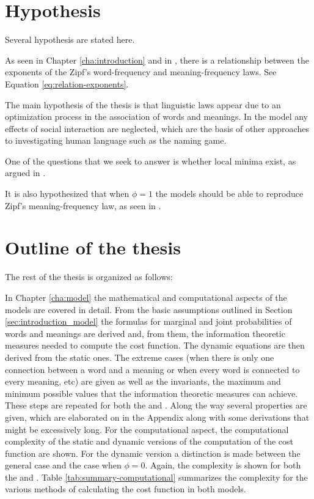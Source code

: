 \section{Hypothesis}
\label{sec:introduction_hypothesis}

Several hypothesis are stated here.

As seen in Chapter \ref{cha:introduction} and in \cite{Ferrer2018a}, there is a relationship between the exponents of the Zipf's word-frequency and meaning-frequency laws.
See Equation \eqref{eq:relation-exponents}.

The main hypothesis of the thesis is that linguistic laws appear due to an optimization process in the association of words and meanings.
In the model any effects of social interaction are neglected, which are the basis of other approaches to investigating human language such as the naming game. \cite{Baronchelli2006}

One of the questions that we seek to answer is whether local minima exist, as argued in \cite{Ferrer2017a}.

It is also hypothesized that when $\phi=1$ the models should be able to reproduce Zipf's meaning-frequency law, as seen in \cite{Ferrer2018a}.

\section{Outline of the thesis}
\label{sec:introduction_outline}

The rest of the thesis is organized as follows:

In Chapter \ref{cha:model} the mathematical and computational aspects of the models are covered in detail.
From the basic assumptions outlined in Section \ref{sec:introduction_model} the formulas for marginal and joint probabilities of words and meanings are derived and, from them, the information theoretic measures needed to compute the cost function.
The dynamic equations are then derived from the static ones. The extreme cases (when there is only one connection between a word and a meaning or when every word is connected to every meaning, etc) are given as well as the invariants, the maximum and minimum possible values that the information theoretic measures can achieve.
These steps are repeated for both the \firstm{} and \secondmodel{}.
Along the way several properties are given, which are elaborated on in the Appendix along with some derivations that might be excessively long.
For the computational aspect, the computational complexity of the static and dynamic versions of the computation of the cost function are shown.
For the dynamic version a distinction is made between the general case and the case when $\phi=0$.
Again, the complexity is shown for both the \firstm{} and \secondmodel{}.
Table \ref{tab:summary-computational} summarizes the complexity for the various methods of calculating the cost function in both models.

